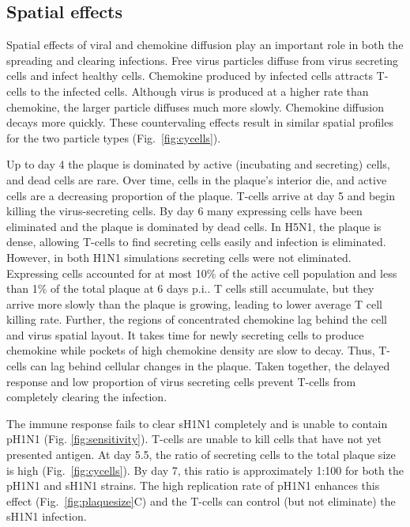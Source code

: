 \documentclass[10pt]{article}
\begin{document}
\subsection*{Spatial effects}

Spatial effects of viral and chemokine diffusion play an important role in both the spreading and clearing infections.  Free virus particles diffuse from virus secreting cells and infect healthy cells.  Chemokine produced by infected cells attracts T-cells to the infected cells.  Although virus is produced at a higher rate than chemokine, the larger particle diffuses much more slowly.  Chemokine diffusion decays more quickly.  These countervaling effects result in similar spatial profiles for the two particle types (Fig.~\ref{fig:cycells}).

Up to day 4 the plaque is dominated by active (incubating and secreting) cells, and dead cells are rare. Over time, cells in the plaque's interior die, and active cells are a decreasing proportion of the plaque. T-cells arrive at day 5 and begin killing the virus-secreting cells. By day 6 many expressing cells have been eliminated and the plaque is dominated by dead cells.  In H5N1, the plaque is dense, allowing T-cells to find secreting cells easily and infection is eliminated.  However, in both H1N1 simulations secreting cells were not eliminated.  Expressing cells accounted for at most 10\% of the active cell population and less than 1\% of the total plaque at 6 days p.i..  T cells still accumulate, but they arrive more slowly than the plaque is growing, leading to lower average T cell killing rate.  Further, the regions of concentrated chemokine lag behind the cell and virus spatial layout.  It takes time for newly secreting cells to produce chemokine while pockets of high chemokine density are slow to decay.  Thus, T-cells can lag behind cellular changes in the plaque.  Taken together, the delayed response and low proportion of virus secreting cells prevent T-cells from completely clearing the infection.

The immune response fails to clear sH1N1 completely and is unable to contain pH1N1 (Fig. \ref{fig:sensitivity}).  T-cells are unable to kill cells that have not yet presented antigen.  At day 5.5, the ratio of secreting cells to the total plaque size is high (Fig.~\ref{fig:cycells}). By day 7, this ratio is approximately 1:100 for both the pH1N1 and sH1N1 strains.  The high replication rate of pH1N1 enhances this effect (Fig.~\ref{fig:plaquesize}C) and the T-cells can control (but not eliminate) the sH1N1 infection.
\end{document}
